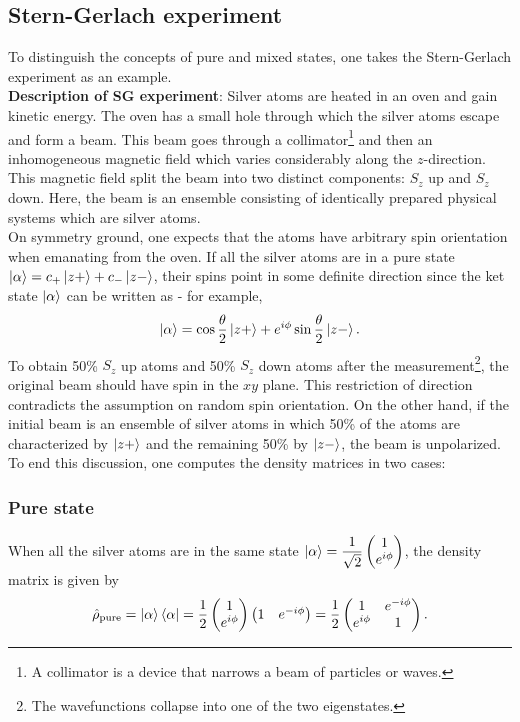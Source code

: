\documentclass[a4paper,12pts,dvipsnames]{article}
\numberwithin{equation}{section}
\begin{document}
\subsection{Stern-Gerlach experiment}
To distinguish the concepts of pure and mixed states, one takes the Stern-Gerlach experiment as an example. \\
\textbf{Description of SG experiment}: Silver atoms are heated in an oven and gain kinetic energy. The oven has a small hole through which the silver atoms escape and form a beam. This beam goes through a collimator\footnote{A collimator is a device that narrows a beam of particles or waves.} and then an inhomogeneous magnetic field which varies considerably along the $z$-direction. This magnetic field split the beam into two distinct components: $S_z$ up and $S_z$ down. Here, the beam is an ensemble consisting of identically prepared physical systems which are silver atoms.\\
On symmetry ground, one expects that the atoms have arbitrary spin orientation when emanating from the oven. If all the silver atoms are in a pure state $\ket{\alpha}=c_+\ket{z+}+c_-\ket{z-}$, their spins point in some definite direction since the ket state $\ket{\alpha}$ can be written as - for example,
\begin{equation}
	\ket{\alpha} = \cos\frac{\theta}{2}\ket{z+} + e^{i\phi}\sin\frac{\theta}{2}\ket{z-}.
\end{equation}
To obtain 50\% $S_z$ up atoms and 50\% $S_z$ down atoms after the measurement\footnote{The wavefunctions collapse into one of the two eigenstates.}, the original beam should have spin in the $xy$ plane. This restriction of direction contradicts the assumption on random spin orientation. On the other hand, if the initial beam is an ensemble of silver atoms in which 50\% of the atoms are characterized by $\ket{z+}$ and the remaining 50\% by $\ket{z-}$, the beam is unpolarized.\\
To end this discussion, one computes the density matrices in two cases:
\subsubsection*{Pure state}
When all the silver atoms are in the same state $\ket{\alpha} = \dfrac{1}{\sqrt{2}}\begin{pmatrix} 1 \\ e^{i\phi} \end{pmatrix}$, the density matrix is given by
\begin{equation}
	\hat{\rho}_{\text{pure}} = \ket{\alpha}\bra{\alpha} = \frac{1}{2}\begin{pmatrix} 1 \\ e^{i\phi} \end{pmatrix}\begin{pmatrix} 1 & e^{-i\phi} \end{pmatrix} = \frac{1}{2}\begin{pmatrix} 1 & e^{-i\phi} \\ e^{i\phi} & 1 \end{pmatrix}.
\end{equation}
\end{document}
